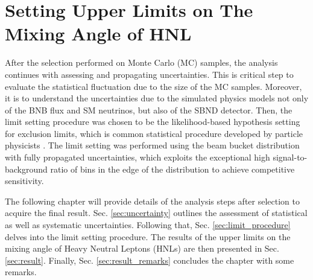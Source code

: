 \chapter{Setting Upper Limits on The Mixing Angle of HNL}
\label{ChapterResult}

\ifpdf
    \graphicspath{{Chapter10/Figs/Raster/}{Chapter10/Figs/PDF/}{Chapter10/Figs/}}
\else
    \graphicspath{{Chapter10/Figs/Vector/}{Chapter10/Figs/}}
\fi


After the selection performed on Monte Carlo (MC) samples, the analysis continues with assessing and propagating uncertainties.
This is critical step to evaluate the statistical fluctuation due to the size of the MC samples.
Moreover, it is to understand the uncertainties due to the simulated physics models not only of the BNB flux and SM neutrinos, but also of the SBND detector.
Then, the limit setting procedure was chosen to be the likelihood-based hypothesis setting for exclusion limits, which is common statistical procedure developed by particle physicists \cite{asymptotic_test}.
The limit setting was performed using the beam bucket distribution with fully propagated uncertainties, which exploits the exceptional high signal-to-background ratio of bins in the edge of the distribution to achieve competitive sensitivity.

The following chapter will provide details of the analysis steps after selection to acquire the final result.
Sec. \ref{sec:uncertainty} outlines the assessment of statistical as well as systematic uncertainties. 
Following that, Sec. \ref{sec:limit_procedure} delves into the limit setting procedure.
The results of the upper limits on the mixing angle of Heavy Neutral Leptons (HNLs) are then presented in Sec. \ref{sec:result}.
Finally, Sec. \ref{sec:result_remarks} concludes the chapter with some remarks.

\clearpage

